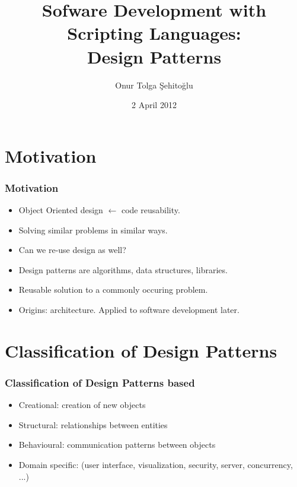 \documentclass[trans,compress,xcolor=table]{beamer}
\title{Sofware Development with Scripting Languages:\\Design Patterns}
\author{Onur Tolga Şehitoğlu}
\institute{Computer Engineering,METU}
\date{2 April 2012}
\begin{document}

%


 \frame{\maketitle}

 \frame{\tableofcontents}

\section{Motivation}
\begin{frame}
\frametitle{Motivation}
\begin{itemize}
\item Object Oriented design $\leftarrow$ code reusability.
\item Solving similar problems in similar ways.
\item Can we re-use design as well?
\item Design patterns are  algorithms, data structures, libraries.
\item Reusable solution to a commonly occuring problem.
\item Origins: architecture. Applied to software development later.
\end{itemize}
\end{frame}

\section{Classification of Design Patterns}
\begin{frame}
\frametitle{Classification of Design Patterns based}
\begin{itemize}
\item Creational: creation of new objects
\item Structural: relationships between entities
\item Behavioural: communication patterns between objects
\item Domain specific: (user interface, visualization, security, server,
	concurrency, ...)
\end{itemize}
\end{frame}
\end{document}
